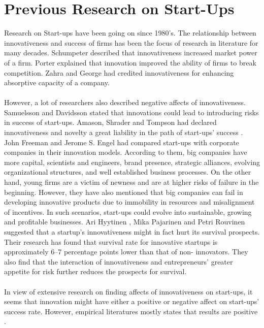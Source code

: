 \section{Previous Research on Start-Ups\label{sec:previous_r_startups}}
Research on Start-ups have been going on since 1980’s. The
relationship between innovativeness and success of firms has been the focus of research in literature
for many decades. Schumpeter \cite{16} described that innovativeness increased market power of a firm.
Porter \cite{17} explained that innovation improved the ability of firms to break competition. Zahra
and George \cite{18} had credited innovativeness for enhancing absorptive capacity of a company.
\\
\\
However, a lot of researchers also described negative affects of innovativeness. Samuelsson and
Davidsson \cite{19} stated that innovations could lead to introducing risks in success of start-ups.
Amason, Shrader and Tompson \cite{20} had declared innovativeness and novelty a great liability in the
path of start-ups’ success . John Freeman and Jerome S. Engel \cite{15} had compared start-ups with
corporate companies in their innovation models. According to them, big companies have
more capital, scientists and engineers, brand presence, strategic alliances, evolving organizational
structures, and well established business processes. On the other hand, young firms are a victim of
newness and are at higher risks of failure in the beginning. However, they have also mentioned that
big companies can fail in developing innovative products due to immobility in resources and
misalignment of incentives. In such scenarios, start-ups could evolve into sustainable, growing and
profitable businesses. Ari Hyytinen , Mika Pajarinen and Petri Rouvinen \cite{21} suggested that a
startup's innovativeness might in fact hurt its survival prospects. Their research has found that
survival rate for innovative startups is approximately 6–7 percentage points lower than that of non-
innovators. They also find that the interaction of innovativeness and entrepreneurs' greater appetite
for risk further reduces the prospects for survival.
\\
\\
In view of extensive research on finding affects of innovativeness on start-ups, it seems
that innovation might have either a positive or negative affect on start-ups’ success rate.
However, empirical literatures mostly states that results are positive \cite{21}.
